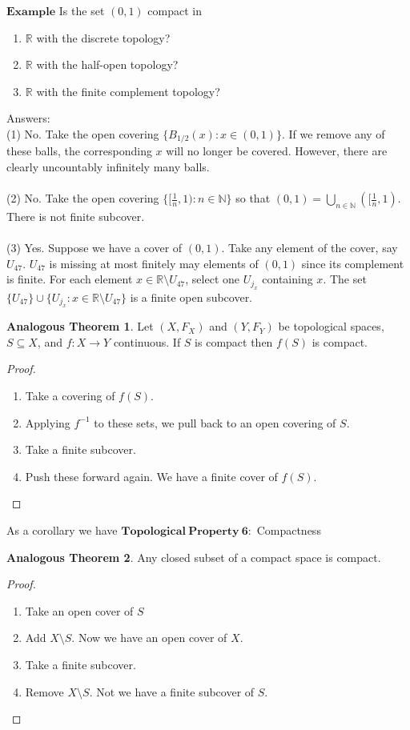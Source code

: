 \documentclass[10pt,reqno]{amsart}
\newcommand{\N}{\mathbb{N}}
\newcommand{\R}{\mathbb{R}}
\newtheorem*{Small Fact}{Small Fact}
\newtheorem*{Small Fact about Basis}{Small Fact about Basis}
\newtheorem*{Tiny Fact about Projection Maps}{Tiny Fact about Projection Maps}
\theoremstyle{definition}
\newtheorem{Analogous Theorem}{Analogous Theorem}
\begin{document}
$\mathbf{ Example}$
Is the set $(0,1)$ compact in 
\begin{enumerate}
\item $\R$ with the discrete topology?
\item $\R$ with the half-open topology?
\item $\R$ with the finite complement topology?
\end{enumerate}
Answers:\\
(1) No. Take the open covering $\{B_{1/2}(x) : x \in (0,1)\}$. If we remove any of these balls, the corresponding $x$ will no longer be covered. However, there are clearly uncountably infinitely many balls. \\\\
(2) No. Take the open covering $\{[\frac{1}{n}, 1) : n \in \N\}$ so that $(0,1) = \bigcup_{n \in \N}([\frac{1}{n}, 1)$. There is not finite subcover. \\\\
(3) Yes. Suppose we have a cover of $(0,1)$. Take any element of the cover, say $U_{47}$. $U_{47}$ is missing at most finitely may elements of $(0,1)$ since its complement is finite. For each element $x \in \R \setminus U_{47}$, select one $U_{j_x}$ containing $x$. The set $\{U_{47}\} \cup \{U_{j_x}: x \in \R \setminus U_{47}\}$ is a finite open subcover. 
\begin{Analogous Theorem}
Let $(X, F_X)$ and $(Y, F_Y)$ be topological spaces, $S \subseteq X$, and $f : X \rightarrow Y$ continuous. If $S$ is compact then $f(S)$ is compact. 
\end{Analogous Theorem}
\begin{proof}
\begin{enumerate}
\item Take a covering of $f(S)$. 
\item Applying $f^{-1}$ to these sets, we pull back to an open covering of $S$.
\item Take a finite subcover. 
\item Push these forward again. We have a finite cover of $f(S)$. 
\end{enumerate}
\end{proof}
As a corollary we have $\mathbf{Topological \ Property \ 6:}$ Compactness
\begin{Analogous Theorem}
Any closed subset of a compact space is compact. 
\end{Analogous Theorem}
\begin{proof}
\begin{enumerate}
\item Take an open cover of $S$
\item Add $X \setminus S$. Now we have an open cover of $X$. 
\item Take a finite subcover.
\item Remove $X \setminus S$. Not we have a finite subcover of $S$. 
\end{enumerate}
\end{proof}
\end{document}

